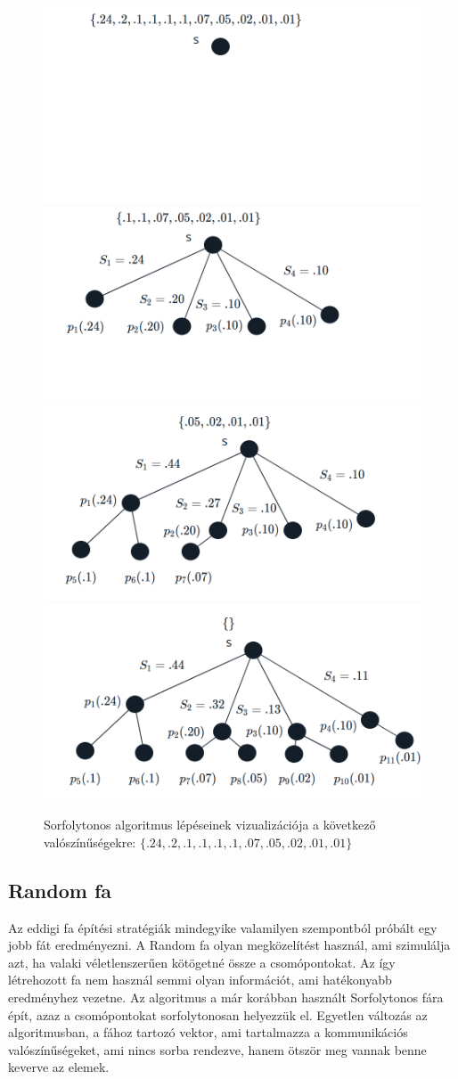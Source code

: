 \documentclass[12pt]{report}
\begin{document}
\begin{figure}[H]
	\begin{center}
		\includegraphics[width=0.49\linewidth]{pictures/bfs1.png}
		\includegraphics[width=0.49\linewidth]{pictures/bfs2.png}
		\includegraphics[width=0.49\linewidth]{pictures/bfs3.png}
		\includegraphics[width=0.49\linewidth]{pictures/bfs4.png}
		\caption{Sorfolytonos algoritmus lépéseinek vizualizációja a következő valószínűségekre: 
			\( \{.24, .2, .1, .1, .1, .1, .07, .05, .02, .01, .01\}\)}
		\label{bfs-algorithm}
	\end{center}
\end{figure}



\subsection{Random fa}

Az eddigi fa építési stratégiák mindegyike valamilyen szempontból próbált egy jobb fát eredményezni.
A Random fa olyan megközelítést használ, ami szimulálja azt, ha valaki véletlenszerűen kötögetné össze a csomópontokat.
Az így létrehozott fa nem használ semmi olyan információt, ami hatékonyabb eredményhez vezetne.
Az algoritmus a már korábban használt Sorfolytonos fára épít, azaz a csomópontokat sorfolytonosan helyezzük el.
Egyetlen változás az algoritmusban, a fához tartozó vektor, ami tartalmazza a kommunikációs valószínűségeket, ami nincs sorba rendezve, hanem ötször meg vannak benne keverve az elemek. 
\end{document}

